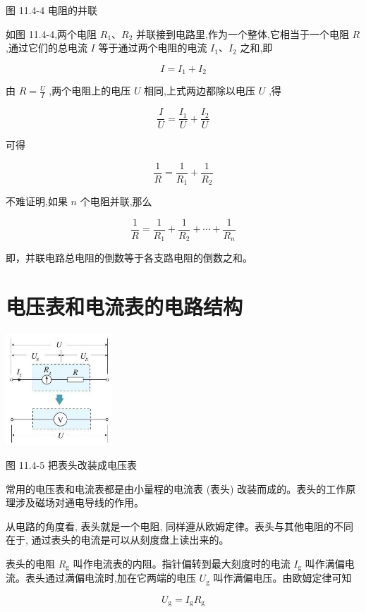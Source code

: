 \documentclass[10pt]{article}
\begin{document}
图 11.4-4 电阻的并联

如图 11.4-4,两个电阻 \({R}_{1}\text{、}{R}_{2}\) 并联接到电路里,作为一个整体,它相当于一个电阻 \(R\) ,通过它们的总电流 \(I\) 等于通过两个电阻的电流 \({I}_{1}\text{、}{I}_{2}\) 之和,即

\[
I = {I}_{1} + {I}_{2}
\]

由 \(R = \frac{U}{I}\) ,两个电阻上的电压 \(U\) 相同,上式两边都除以电压 \(U\) ,得

\[
\frac{I}{U} = \frac{{I}_{1}}{U} + \frac{{I}_{2}}{U}
\]

可得

\[
\frac{1}{R} = \frac{1}{{R}_{1}} + \frac{1}{{R}_{2}} \tag{（2）}
\]

不难证明,如果 \(n\) 个电阻并联,那么

\[
\frac{1}{R} = \frac{1}{{R}_{1}} + \frac{1}{{R}_{2}} + \cdots + \frac{1}{{R}_{n}}
\]

即，并联电路总电阻的倒数等于各支路电阻的倒数之和。

\section*{电压表和电流表的电路结构}

\begin{center}
\includegraphics[max width=0.3\textwidth]{images/01911d5f-8e38-70c0-b5b8-2b399bd115b6_75_136250.jpg}
\end{center}

图 11.4-5 把表头改装成电压表

常用的电压表和电流表都是由小量程的电流表 (表头) 改装而成的。表头的工作原理涉及磁场对通电导线的作用。

从电路的角度看, 表头就是一个电阻, 同样遵从欧姆定律。表头与其他电阻的不同在于, 通过表头的电流是可以从刻度盘上读出来的。

表头的电阻 \({R}_{\mathrm{g}}\) 叫作电流表的内阻。指针偏转到最大刻度时的电流 \({I}_{\mathrm{g}}\) 叫作满偏电流。表头通过满偏电流时,加在它两端的电压 \({U}_{\mathrm{g}}\) 叫作满偏电压。由欧姆定律可知

\[
{U}_{\mathrm{g}} = {I}_{\mathrm{g}}{R}_{\mathrm{g}}
\]
\end{document}
